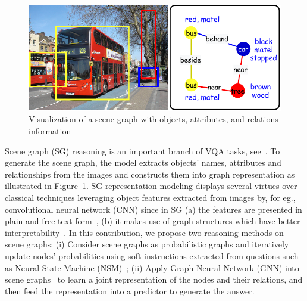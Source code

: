 \documentclass[letterpaper]{article} %
\begin{document}
\begin{figure}[ht] 
    \centering 
    \includegraphics[scale=0.5]{./pic/intro.pdf} 
    \caption{Visualization of a scene graph with objects, attributes, and relations information} 
    \label{scene-graph} 
\end{figure}

Scene graph (SG) reasoning is an important branch of VQA tasks, see~\cite{DBLP:journals/corr/abs-2007-01072}. 
To generate the scene graph, the model extracts objects' names, attributes and relationships from the images and constructs them into graph representation as illustrated in Figure~\ref{scene-graph}. 
SG representation modeling displays several virtues over classical techniques leveraging object features extracted from images by, for eg., convolutional neural network (CNN) since in SG (a) the features are presented in plain and free text form~\cite{DBLP:journals/corr/abs-2101-05479}, (b) it makes use of graph structures which have better interpretability~\cite{DBLP:conf/bmvc/ZhangCX19}.
In this contribution, we propose two reasoning methods on scene graphs: (i) Consider scene graphs as probabilistic graphs and iteratively update nodes' probabilities using soft instructions extracted from questions such as Neural State Machine (NSM)~\cite{DBLP:conf/nips/HudsonM19,DBLP:conf/ijcnn/LeLV020}; (ii) Apply Graph Neural Network (GNN) into scene graphs~\cite{inproceedings,DBLP:conf/iccv/LiGCL19} to learn a joint representation of the nodes and their relations, and then feed the representation into a predictor to generate the answer.
\end{document}
